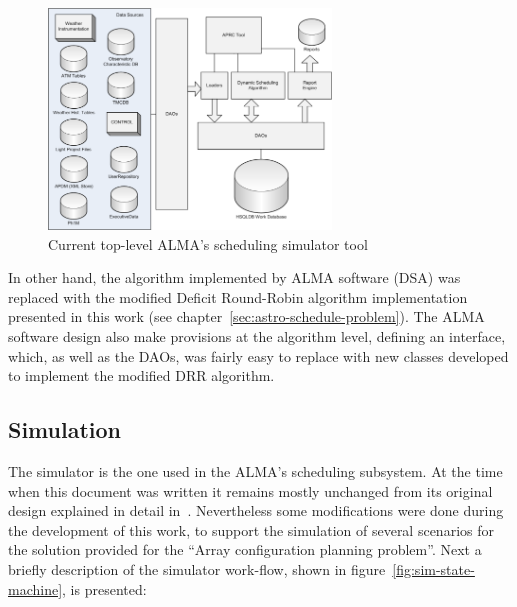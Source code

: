 \begin{figure}[h!]	
\begin{center}
\includegraphics[width=0.67\textwidth]{images/simulator-arch}
\end{center}
\caption{Current top-level ALMA's scheduling simulator tool}
\label{fig:sim-top-level-architecture}
\end{figure}

In other hand, the algorithm implemented by ALMA software (DSA) was replaced with the modified Deficit Round-Robin algorithm implementation presented in this work (see chapter~\ref{sec:astro-schedule-problem}). The ALMA software design also make provisions at the algorithm level, defining an interface, which, as well as the DAOs, was fairly easy to replace with new classes developed to implement the modified DRR algorithm.

\subsection {Simulation}
The simulator is the one used in the ALMA's scheduling subsystem. At the time when this document was written it remains mostly unchanged from its original design explained in detail in~\cite{hoffstadt10}. Nevertheless some modifications were done during the development of this work, to support the simulation of several scenarios for the solution provided for the ``Array configuration planning problem''. Next a briefly description of the simulator work-flow, shown in figure~\ref{fig:sim-state-machine}, is presented:

